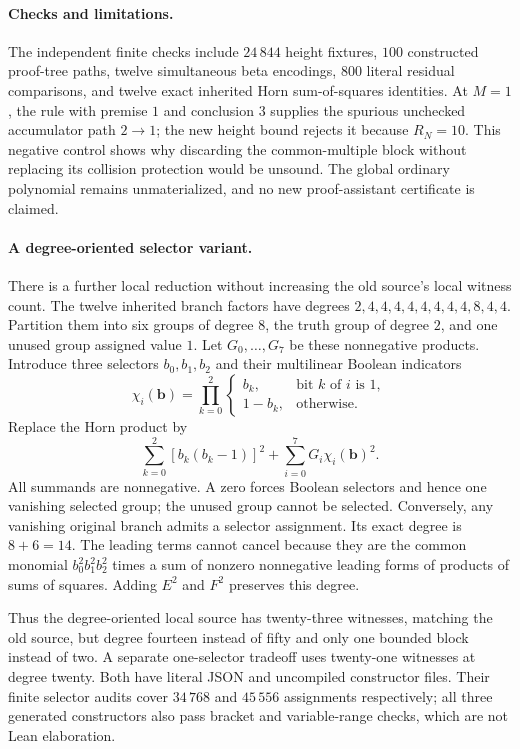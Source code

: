 \paragraph{Checks and limitations.}
The independent finite checks include $24\,844$ height fixtures, $100$
constructed proof-tree paths, twelve simultaneous beta encodings, $800$
literal residual comparisons, and twelve exact inherited Horn
sum-of-squares identities. At $M=1$, the rule with premise $1$ and
conclusion $3$ supplies the spurious unchecked accumulator path $2\to1$;
the new height bound rejects it because $R_N=10$. This negative control
shows why discarding the common-multiple block without replacing its
collision protection would be unsound. The global ordinary polynomial
remains unmaterialized, and no new proof-assistant certificate is claimed.

\paragraph{A degree-oriented selector variant.}
There is a further local reduction without increasing the old source's
local witness count. The twelve inherited branch factors have degrees
$2,4,4,4,4,4,4,4,4,8,4,4$. Partition them into six groups of degree
$8$, the truth group of degree $2$, and one unused group assigned value
$1$. Let $G_0,\ldots,G_7$ be these nonnegative products. Introduce three
selectors $b_0,b_1,b_2$ and their multilinear Boolean indicators
\[
 \chi_i(\mathbf b)=\prod_{k=0}^2
 \begin{cases}b_k,&\text{bit }k\text{ of }i\text{ is }1,\\
 1-b_k,&\text{otherwise}.
 \end{cases}
\]
Replace the Horn product by
\[
 \sum_{k=0}^2[b_k(b_k-1)]^2+
 \sum_{i=0}^7G_i\chi_i(\mathbf b)^2.
\]
All summands are nonnegative. A zero forces Boolean selectors and hence
one vanishing selected group; the unused group cannot be selected.
Conversely, any vanishing original branch admits a selector assignment.
Its exact degree is $8+6=14$. The leading terms cannot cancel because
they are the common monomial $b_0^2b_1^2b_2^2$ times a sum of nonzero
nonnegative leading forms of products of sums of squares. Adding $E^2$
and $F^2$ preserves this degree.

Thus the degree-oriented local source has twenty-three witnesses,
matching the old source, but degree fourteen instead of fifty and only
one bounded block instead of two. A separate one-selector tradeoff uses
twenty-one witnesses at degree twenty. Both have literal JSON and
uncompiled constructor files. Their finite selector audits cover
$34\,768$ and $45\,556$ assignments respectively; all three generated
constructors also pass bracket and variable-range checks, which are not
Lean elaboration.

